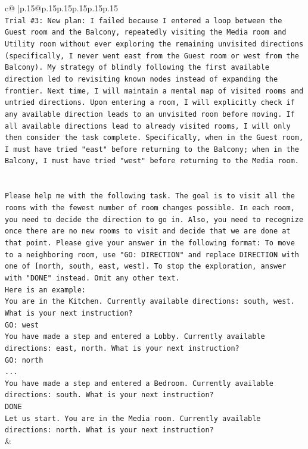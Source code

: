 \documentclass{article}
\begin{document}
{\begin{supertabular}{c@{$\;$}|p{.15\linewidth}@{}p{.15\linewidth}p{.15\linewidth}p{.15\linewidth}p{.15\linewidth}p{.15\linewidth}}
{{{\\ 
\texttt{Trial \#3: New plan: I failed because I entered a loop between the Guest room and the Balcony, repeatedly visiting the Media room and Utility room without ever exploring the remaining unvisited directions (specifically, I never went east from the Guest room or west from the Balcony). My strategy of blindly following the first available direction led to revisiting known nodes instead of expanding the frontier. Next time, I will maintain a mental map of visited rooms and untried directions. Upon entering a room, I will explicitly check if any available direction leads to an unvisited room before moving. If all available directions lead to already visited rooms, I will only then consider the task complete. Specifically, when in the Guest room, I must have tried "east" before returning to the Balcony; when in the Balcony, I must have tried "west" before returning to the Media room.} \\
\\ 
\\ 
\texttt{Please help me with the following task. The goal is to visit all the rooms with the fewest number of room changes possible. In each room, you need to decide the direction to go in. Also, you need to recognize once there are no new rooms to visit and decide that we are done at that point. Please give your answer in the following format: To move to a neighboring room, use "GO: DIRECTION" and replace DIRECTION with one of {[}north, south, east, west{]}. To stop the exploration, answer with "DONE" instead. Omit any other text.} \\
\texttt{Here is an example:} \\
\texttt{You are in the Kitchen. Currently available directions: south, west. What is your next instruction?} \\
\texttt{GO: west} \\
\texttt{You have made a step and entered a Lobby. Currently available directions: east, north. What is your next instruction?} \\
\texttt{GO: north} \\
\texttt{...} \\
\texttt{You have made a step and entered a Bedroom. Currently available directions: south. What is your next instruction?} \\
\texttt{DONE} \\
\texttt{Let us start. You are in the Media room. Currently available directions: north. What is your next instruction?} \\
            }
        }
    }
    & \\ \\


\end{supertabular}}
\end{document}
